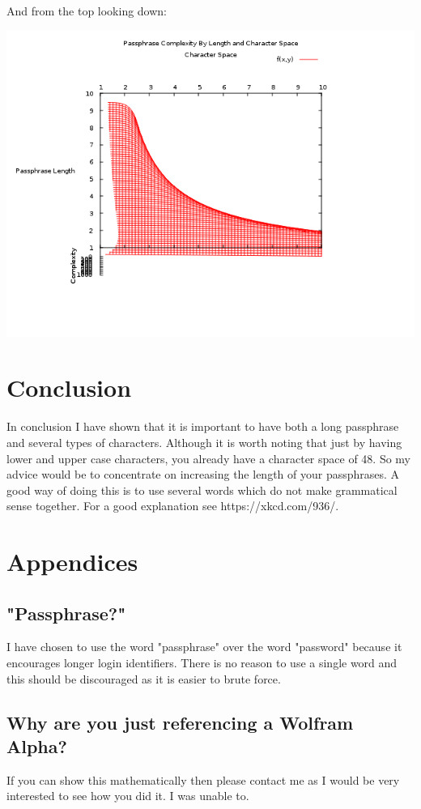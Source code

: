 \documentclass[11pt,a4paper]{article}
\begin{document}
And from the top looking down:

\includegraphics[scale=0.8]{graph2.png}

\section{Conclusion}
In conclusion I have shown that it is important to have both a long passphrase and several types of characters. Although it is worth noting that just by having lower and upper case characters, you already have a character space of 48. So my advice would be to concentrate on increasing the length of your passphrases. A good way of doing this is to use several words which do not make grammatical sense together. For a good explanation see https://xkcd.com/936/.

\pagebreak
\section{Appendices}
\subsection{"Passphrase?"}
I have chosen to use the word "passphrase" over the word "password" because it encourages longer login identifiers. There is no reason to use a single word and this should be discouraged as it is easier to brute force.

\subsection{Why are you just referencing a Wolfram Alpha?}
If you can show this mathematically then please contact me as I would be very interested to see how you did it. I was unable to.
\end{document}
